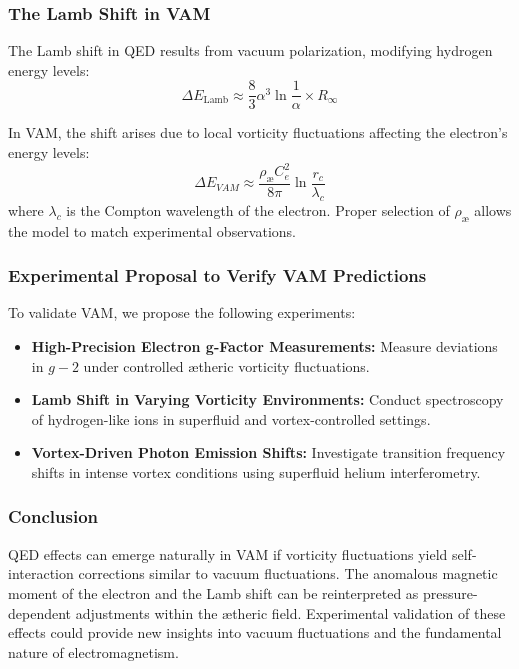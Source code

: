 \subsubsection*{The Lamb Shift in VAM}
The Lamb shift in QED results from vacuum polarization, modifying hydrogen energy levels:
\begin{equation*}
    \Delta E_{\text{Lamb}} \approx \frac{8}{3} \alpha^3 \ln \frac{1}{\alpha} \times R_{\infty}
\end{equation*}

In VAM, the shift arises due to local vorticity fluctuations affecting the electron's energy levels:
\begin{equation*}
    \Delta E_{VAM} \approx \frac{\rho_{\text{\ae}} C_e^2}{8\pi} \ln \frac{r_c}{\lambda_c}
\end{equation*}
where $\lambda_c$ is the Compton wavelength of the electron. Proper selection of $\rho_{\text{\ae}}$ allows the model to match experimental observations.

\subsubsection*{Experimental Proposal to Verify VAM Predictions}
To validate VAM, we propose the following experiments:
\begin{itemize}
    \item \textbf{High-Precision Electron g-Factor Measurements:} Measure deviations in $g-2$ under controlled ætheric vorticity fluctuations.
    \item \textbf{Lamb Shift in Varying Vorticity Environments:} Conduct spectroscopy of hydrogen-like ions in superfluid and vortex-controlled settings.
    \item \textbf{Vortex-Driven Photon Emission Shifts:} Investigate transition frequency shifts in intense vortex conditions using superfluid helium interferometry.
\end{itemize}

\subsubsection*{Conclusion}
QED effects can emerge naturally in VAM if vorticity fluctuations yield self-interaction corrections similar to vacuum fluctuations. The anomalous magnetic moment of the electron and the Lamb shift can be reinterpreted as pressure-dependent adjustments within the ætheric field. Experimental validation of these effects could provide new insights into vacuum fluctuations and the fundamental nature of electromagnetism.